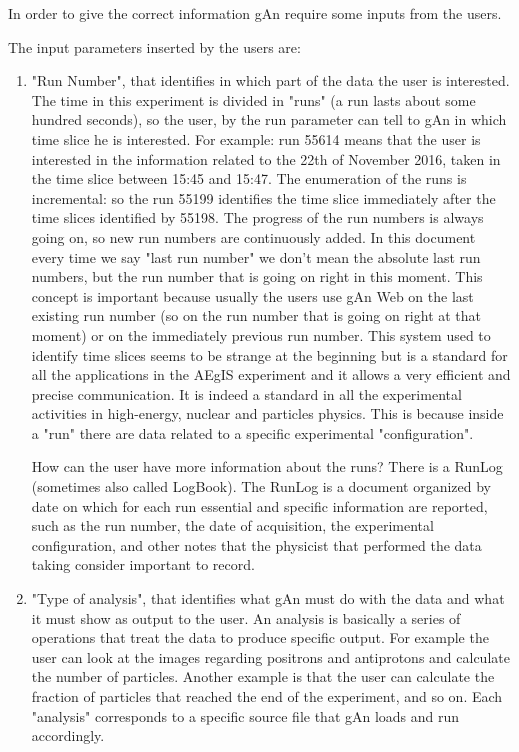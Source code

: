In order to give the correct information gAn require some inputs from the users.

The input parameters inserted by the users are:
\begin{enumerate}

\item "Run Number", that identifies in which part of the data the user is interested. 
The time in this experiment is divided in "runs" (a run lasts about some hundred seconds), so the user, by the run parameter can tell to gAn in which time slice he is interested. For example: run 55614 means that the user is interested in the information related to the 22th of November 2016, taken in the time slice between 15:45 and 15:47. 
The enumeration of the runs is incremental: so the run 55199 identifies the time slice immediately after the time slices identified by 55198. The progress of the run numbers is always going on, so new run numbers are continuously added. 
In this document every time we say "last run number" we don't mean the absolute last run numbers, but the run number that is going on right in this moment. This concept is important because usually the users use gAn Web on the last existing run number (so on the run number that is going on right at that moment) or on the immediately previous run number.  
This system used to identify time slices seems to be strange at the beginning but is a standard for all the applications in the AEgIS experiment and it allows a very efficient and precise communication. It is indeed a standard in all the experimental activities in high-energy, nuclear and particles physics. This is because inside a "run" there are data related to a specific experimental "configuration".

How can the user have more information about the runs? 
There is a RunLog (sometimes also called LogBook). The RunLog is a document organized by date on which for each run essential and specific information are reported, such as the run number, the date of acquisition, the experimental configuration, and other notes that the physicist that performed the data taking consider important to record.

\item "Type of analysis", that identifies what gAn must do with the data and what it must show as output to the user.
An analysis is basically a series of operations that treat the data to produce specific output. For example the user can look at the images regarding positrons and antiprotons and calculate the number of particles. Another example is that the user can calculate the fraction of particles that reached the end of the experiment, and so on. Each "analysis" corresponds to a specific source file that gAn loads and run accordingly.

\end{enumerate}


